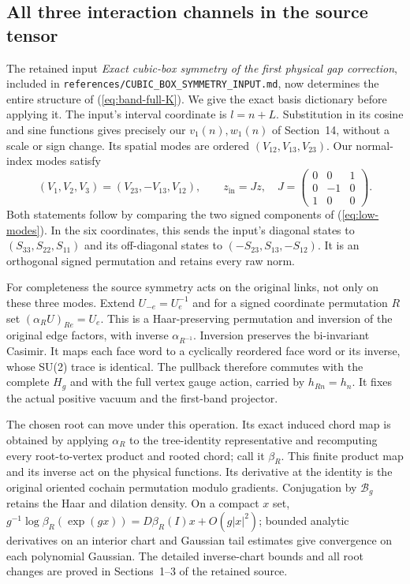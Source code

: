 \subsection{All three interaction channels in the source tensor}

The retained input \emph{Exact cubic-box symmetry of the first
physical gap correction}, included in
\texttt{references/CUBIC\_BOX\_SYMMETRY\_INPUT.md}, now determines
the entire structure of (\ref{eq:band-full-K}). We give the exact
basis dictionary before applying it. The input's interval coordinate
is $l=n+L$. Substitution in its cosine and sine functions gives
precisely our $v_1(n),w_1(n)$ of Section~14, without a scale or sign
change. Its spatial modes are ordered $(V_{12},V_{13},V_{23})$.
Our normal-index modes satisfy
\[
 (V_1,V_2,V_3)=(V_{23},-V_{13},V_{12}),\qquad
 z_{\mathrm{in}}=Jz,\quad
 J=\begin{pmatrix}0&0&1\\0&-1&0\\1&0&0\end{pmatrix}.
\]
Both statements follow by comparing the two signed components of
(\ref{eq:low-modes}). In the six coordinates, this sends the
input's diagonal states to $(S_{33},S_{22},S_{11})$ and its
off-diagonal states to $(-S_{23},S_{13},-S_{12})$.
It is an orthogonal signed permutation and retains every raw norm.

For completeness the source symmetry acts on the original links,
not only on these three modes. Extend $U_{-e}=U_e^{-1}$ and for a
signed coordinate permutation $R$ set $(\alpha_RU)_{Re}=U_e$.
This is a Haar-preserving permutation and inversion of the original
edge factors, with inverse $\alpha_{R^{-1}}$. Inversion preserves
the bi-invariant Casimir. It maps each face word to a cyclically
reordered face word or its inverse, whose SU(2) trace is identical.
The pullback therefore commutes with the complete $H_g$ and with
the full vertex gauge action, carried by $h_{Rn}=h_n$. It fixes the
actual positive vacuum and the first-band projector.

The chosen root can move under this operation. Its exact induced
chord map is obtained by applying $\alpha_R$ to the tree-identity
representative and recomputing every root-to-vertex product and
rooted chord; call it $\beta_R$. This finite product map and its
inverse act on the physical functions. Its derivative at the
identity is the original oriented cochain permutation modulo
gradients. Conjugation by $\mathcal B_g$ retains the Haar and
dilation density. On a compact $x$ set,
$g^{-1}\log\beta_R(\exp(gx))=D\beta_R(I)x+O(g|x|^2)$;
bounded analytic derivatives on an interior chart and Gaussian
tail estimates give convergence on each polynomial Gaussian.
The detailed inverse-chart bounds and all root changes are proved
in Sections~1--3 of the retained source.

